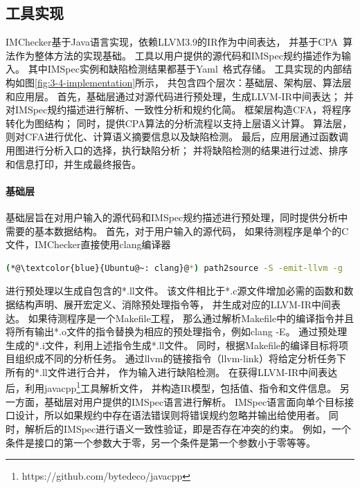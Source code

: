 \subsection{工具实现}
IMChecker基于Java语言实现，依赖LLVM3.9的IR作为中间表达，
并基于CPA~\cite{07-cav-cpachecker}算法作为整体方法的实现基础。
工具以用户提供的源代码和IMSpec规约描述作为输入。
其中IMSpec实例和缺陷检测结果都基于Yaml~\cite{yaml}格式存储。
工具实现的内部结构如图\ref{fig:3-4-implementation}所示，
共包含四个层次：基础层、架构层、算法层和应用层。
首先，基础层通过对源代码进行预处理，生成LLVM-IR中间表达；
并对IMSpec规约描述进行解析、一致性分析和规约化简。
框架层构造CFA，将程序转化为图结构；
同时，提供CPA算法的分析流程以支持上层语义计算。
算法层，则对CFA进行优化、计算语义摘要信息以及缺陷检测。
最后，应用层通过函数调用图进行分析入口的选择，执行缺陷分析；
并将缺陷检测的结果进行过滤、排序和信息打印，并生成最终报告。

\paragraph{基础层}
基础层旨在对用户输入的源代码和IMSpec规约描述进行预处理，同时提供分析中需要的基本数据结构。
首先，对于用户输入的源代码，
如果待测程序是单个的C文件，IMChecker直接使用clang编译器
\begin{lstlisting}[language={bash},
basicstyle=\linespread{0.8}\listingsfont,
numbers=none,
xleftmargin=.25\textwidth]
(*@\textcolor{blue}{Ubuntu@~: clang}@*) path2source -S -emit-llvm -g
\end{lstlisting}
进行预处理以生成自包含的*.ll文件。
该文件相比于*.c源文件增加必需的函数和数据结构声明、展开宏定义、消除预处理指令等，
并生成对应的LLVM-IR中间表达。
如果待测程序是一个Makefile工程，
那么通过解析Makefile中的编译指令并且将所有输出*.o文件的指令替换为相应的预处理指令，例如clang -E。
通过预处理生成的*.i文件，利用上述指令生成*.ll文件。
同时，根据Makefile的编译目标将项目组织成不同的分析任务。
通过llvm的链接指令（llvm-link）将给定分析任务下所有的*.ll文件进行合并，
作为输入进行缺陷检测。
在获得LLVM-IR中间表达后，利用javacpp\footnote{https://github.com/bytedeco/javacpp}工具解析文件，
并构造IR模型，包括值、指令和文件信息。
另一方面，基础层对用户提供的IMSpec语言进行解析。
IMSpec语言面向单个目标接口设计，所以如果规约中存在语法错误则将错误规约忽略并输出给使用者。
同时，解析后的IMSpec进行语义一致性验证，即是否存在冲突的约束。
例如，一个条件是接口的第一个参数大于零，另一个条件是第一个参数小于零等等。

